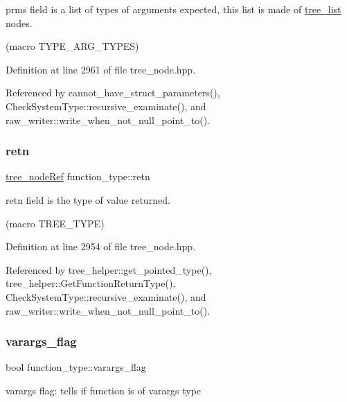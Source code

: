 prms field is a list of types of arguments expected, this list is made of \hyperlink{structtree__list}{tree\+\_\+list} nodes. 

(macro T\+Y\+P\+E\+\_\+\+A\+R\+G\+\_\+\+T\+Y\+P\+ES) 

Definition at line 2961 of file tree\+\_\+node.\+hpp.



Referenced by cannot\+\_\+have\+\_\+struct\+\_\+parameters(), Check\+System\+Type\+::recursive\+\_\+examinate(), and raw\+\_\+writer\+::write\+\_\+when\+\_\+not\+\_\+null\+\_\+point\+\_\+to().

\mbox{\label{structfunction__type_a35e99bb540c752172fe404d698683a98}} 
\subsubsection{\texorpdfstring{retn}{retn}}
{\footnotesize\ttfamily \hyperlink{tree__node_8hpp_a6ee377554d1c4871ad66a337eaa67fd5}{tree\+\_\+node\+Ref} function\+\_\+type\+::retn}



retn field is the type of value returned. 

(macro T\+R\+E\+E\+\_\+\+T\+Y\+PE) 

Definition at line 2954 of file tree\+\_\+node.\+hpp.



Referenced by tree\+\_\+helper\+::get\+\_\+pointed\+\_\+type(), tree\+\_\+helper\+::\+Get\+Function\+Return\+Type(), Check\+System\+Type\+::recursive\+\_\+examinate(), and raw\+\_\+writer\+::write\+\_\+when\+\_\+not\+\_\+null\+\_\+point\+\_\+to().

\mbox{\label{structfunction__type_a771f667b1830585df47dafaee5e485b2}} 
\subsubsection{\texorpdfstring{varargs\+\_\+flag}{varargs\_flag}}
{\footnotesize\ttfamily bool function\+\_\+type\+::varargs\+\_\+flag}



varargs flag\+: tells if function is of varargs type 



